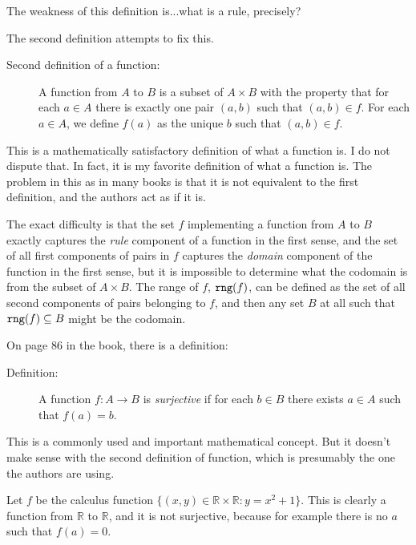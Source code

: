 \documentclass[12pt]{article}
\begin{document}
The weakness of this definition is...what is a rule, precisely?

The second definition attempts to fix this.

\begin{description}

\item [Second definition of a function:]  A function from $A$ to $B$ is a subset of $A \times B$ with the property that for each $a \in A$ there is exactly one pair $(a,b)$ such that $(a,b) \in f$.   For each $a \in A$, we define $f(a)$ as the unique $b$ such that $(a,b) \in f$.

\end{description}

This is a mathematically satisfactory definition of what a function is.  I do not dispute that.  In fact, it is my favorite definition of what a function is.  The problem in this as in many books is that it is not equivalent to the first definition, and the authors act as if it is.

The exact difficulty is that the set $f$ implementing a function from $A$ to $B$ exactly captures the {\em rule\/} component of a function in the first sense, and the set  of all first components of pairs in $f$ captures the {\em domain\/} component of the function in the first sense, but it is impossible to determine what the codomain is from the subset of $A \times B$.
The range of $f$, ${\tt rng}(f)$, can be defined as the set of all second components of pairs belonging to $f$, and then any set $B$ at all such that ${\tt rng}(f) \subseteq B$ might be the codomain.

On page 86 in the book, there is a definition:

\begin{description}

\item[Definition:]  A function $f:A \rightarrow B$ is {\em surjective\/} if for each $b \in B$ there exists $a \in A$ such that $f(a)=b$.

\end{description}

This is a commonly used and important mathematical concept.  But it doesn't make sense with the second definition of function, which is presumably the one the authors are using.

Let $f$ be the calculus function $\{(x,y) \in {\mathbb R} \times {\mathbb R}:y=x^2+1\}$.  This is clearly a function from
$\mathbb R$ to $\mathbb R$, and it is not surjective, because for example there is no $a$ such that $f(a)=0$.
\end{document}
